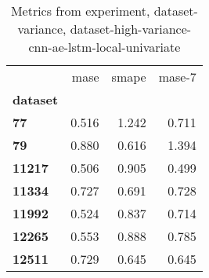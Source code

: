 \begin{table}[h]
\centering
\caption{Metrics from experiment, dataset-variance, dataset-high-variance-cnn-ae-lstm-local-univariate}
\label{table:dataset-high-variance-cnn-ae-lstm-local-univariate-dataset-variance}
\begin{tabular}{lrrr}
\toprule
{} &   mase &  smape &  mase-7 \\
\textbf{dataset} &        &        &         \\
\midrule
\textbf{77     } &  0.516 &  1.242 &   0.711 \\
\textbf{79     } &  0.880 &  0.616 &   1.394 \\
\textbf{11217  } &  0.506 &  0.905 &   0.499 \\
\textbf{11334  } &  0.727 &  0.691 &   0.728 \\
\textbf{11992  } &  0.524 &  0.837 &   0.714 \\
\textbf{12265  } &  0.553 &  0.888 &   0.785 \\
\textbf{12511  } &  0.729 &  0.645 &   0.645 \\
\bottomrule
\end{tabular}
\end{table}
